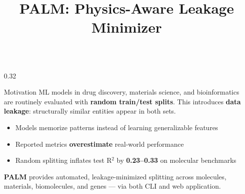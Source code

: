 \documentclass[final]{beamer}
\title{PALM: Physics-Aware Leakage Minimizer}
\author{}  %
\institute{}  %
\begin{document}
\begin{frame}[t]

\begin{columns}[T]

\begin{column}{0.32\textwidth}

\begin{block}{Motivation}
ML models in drug discovery, materials science, and bioinformatics are routinely evaluated with \textbf{random train/test splits}. This introduces \textbf{data leakage}: structurally similar entities appear in both sets.

\vspace{0.5ex}
\begin{center}
\end{center}

\vspace{0.5ex}
\begin{itemize}
  \item Models memorize patterns instead of learning generalizable features
  \item Reported metrics \textbf{overestimate} real-world performance
  \item Random splitting inflates test R$^2$ by \textbf{0.23--0.33} on molecular benchmarks
\end{itemize}

\vspace{0.5ex}
\textbf{PALM} provides automated, leakage-minimized splitting across molecules, materials, biomolecules, and genes --- via both CLI and web application.
\end{block}


\end{column}
\end{columns}
\end{frame}
\end{document}
